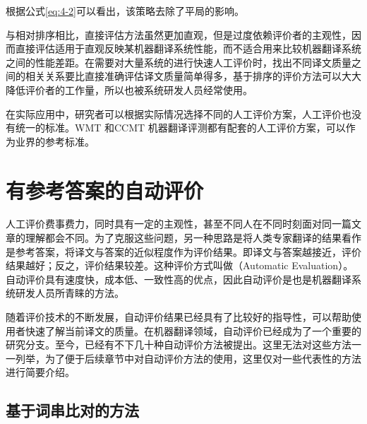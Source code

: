 \begin{itemize}
\begin{itemize}
根据公式\eqref{eq:4-2}可以看出，该策略去除了平局的影响。
    \end{itemize}
\vspace{0.5em}
\end{itemize}

\parinterval 与相对排序相比，直接评估方法虽然更加直观，但是过度依赖评价者的主观性，因而直接评估适用于直观反映某机器翻译系统性能，而不适合用来比较机器翻译系统之间的性能差距。在需要对大量系统的进行快速人工评价时，找出不同译文质量之间的相关关系要比直接准确评估译文质量简单得多，基于排序的评价方法可以大大降低评价者的工作量，所以也被系统研发人员经常使用。

\parinterval 在实际应用中，研究者可以根据实际情况选择不同的人工评价方案，人工评价也没有统一的标准。WMT 和CCMT 机器翻译评测都有配套的人工评价方案，可以作为业界的参考标准。

\sectionnewpage
\section{有参考答案的自动评价}\label{Automatic evaluation with reference answers}

\parinterval 人工评价费事费力，同时具有一定的主观性，甚至不同人在不同时刻面对同一篇文章的理解都会不同。为了克服这些问题，另一种思路是将人类专家翻译的结果看作是参考答案，将译文与答案的近似程度作为评价结果。即译文与答案越接近，评价结果越好；反之，评价结果较差。这种评价方式叫做{\small{}}（Automatic Evaluation）。自动评价具有速度快，成本低、一致性高的优点，因此自动评价是也是机器翻译系统研发人员所青睐的方法。

\parinterval 随着评价技术的不断发展，自动评价结果已经具有了比较好的指导性，可以帮助使用者快速了解当前译文的质量。在机器翻译领域，自动评价已经成为了一个重要的研究分支。至今，已经有不下几十种自动评价方法被提出。这里无法对这些方法一一列举，为了便于后续章节中对自动评价方法的使用，这里仅对一些代表性的方法进行简要介绍。


\subsection{基于词串比对的方法}


